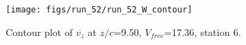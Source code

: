 \begin{figure}[H]
\centering
\texttt{[image: figs/run\_52/run\_52\_W\_contour]}
\caption{Contour plot of $\overline{v_{z}}$ at $z/c$=9.50, $V_{free}$=17.36, station 6.}
\label{fig:run_52_W_contour}
\end{figure}



